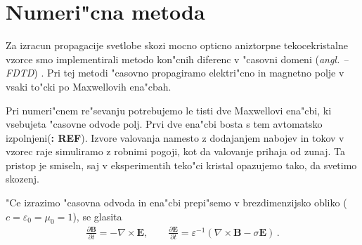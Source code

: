 \documentclass[12pt,twoside,openright,final]{report}
\newcommand{\todo}[1]{(\textbf{\textsmaller{TODO}: #1})}
\newcommand{\odvod}[2]{\frac{\partial #1}{\partial #2}}
\renewcommand{\vec}{\mathbf}
\newcommand{\eps}{\varepsilon}
\newcommand{\angl}[1]{(\textit{angl. #1})}
\renewcommand{\acf}[1]{\aclu{#1} -- \acs{#1}}
\begin{document}

\chapter{Numeri"cna metoda}

Za izracun propagacije svetlobe skozi mocno opticno aniztorpne tekocekristalne vzorce smo implementirali metodo kon"cnih diferenc v "casovni domeni \angl{\acf{FDTD}} \cite{taflove}. 
Pri tej metodi "casovno propagiramo elektri"cno in magnetno polje v vsaki to"cki po Maxwellovih ena"cbah. 

Pri numeri"cnem re"sevanju potrebujemo le tisti dve Maxwellovi ena"cbi, ki vsebujeta "casovne odvode polj. 
Prvi dve ena"cbi bosta s tem avtomatsko izpolnjeni\todo{REF}. 
Izvore valovanja namesto z dodajanjem nabojev in tokov v vzorec raje simuliramo z robnimi pogoji, kot da valovanje prihaja od zunaj. 
Ta pristop je smiseln, saj v eksperimentih teko"ci kristal opazujemo tako, da svetimo skozenj. 

"Ce izrazimo "casovna odvoda in ena"cbi prepi"semo v brezdimenzijsko obliko ($c = \varepsilon_0 = \mu_0 = 1$), se glasita
\begin{align}
\label{eq:maxwell-base}
 \odvod{\vec{B}}{t} = -\nabla \times \vec{E}, \qquad \odvod{\vec{E}}{t} = \eps^{-1} (\nabla \times \vec{B} - \sigma \vec E)\,.
\end{align}
\end{document}
